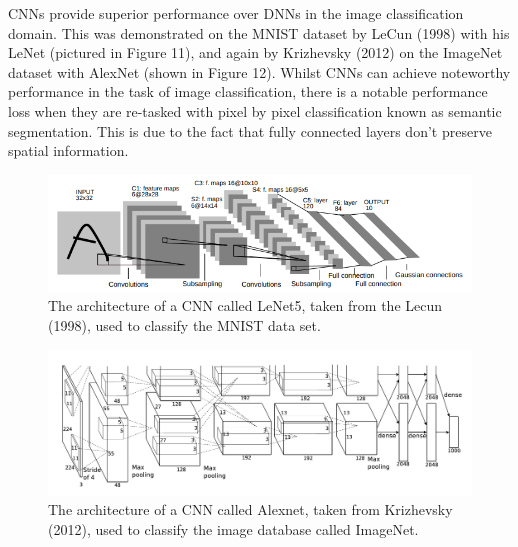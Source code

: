 \documentclass[a4paper]{article}
\begin{document}
CNNs provide superior performance over DNNs in the image classification domain. This was demonstrated on the MNIST dataset by LeCun (1998) with his LeNet (pictured in Figure 11), and again by Krizhevsky (2012) on the ImageNet dataset with AlexNet (shown in Figure 12). Whilst CNNs can achieve noteworthy performance in the task of image classification, there is a notable performance loss when they are re-tasked with pixel by pixel classification known as semantic segmentation. This is due to the fact that fully connected layers don't preserve spatial information.
\begin{figure}[h]
\centering
\includegraphics[scale=0.6]{lenet5}
\caption{The architecture of a CNN called LeNet5, taken from the Lecun (1998), used to classify the MNIST data set.}
\end{figure}

\begin{figure}[h]
\centering
\includegraphics[scale=0.25]{alexnet}
\caption{The architecture of a CNN called Alexnet, taken from Krizhevsky (2012), used to classify the image database called ImageNet.}
\end{figure}

\clearpage
\end{document}
